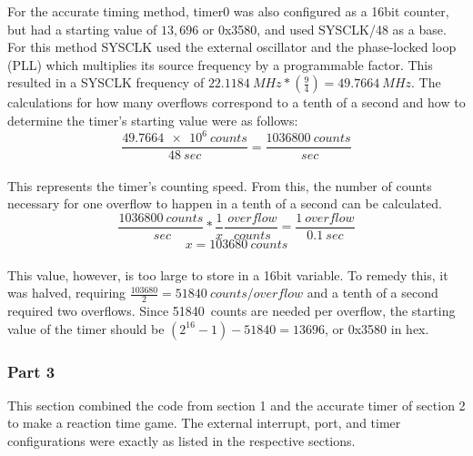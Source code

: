 \documentclass[12pt]{article}
\begin{document}
For the accurate timing method, timer0 was also configured as a 16bit counter, but had a starting value of $13,696$ or 0x3580, and used SYSCLK/48 as a base. For this method SYSCLK used the external oscillator and the phase-locked loop (PLL) which multiplies its source frequency by a programmable factor. This resulted in a SYSCLK frequency of \begin{math}
	\SI{22.1184}{MHz}*\left(\frac{9}{4}\right) = \SI{49.7664}{MHz}
\end{math}.  The calculations for how many overflows correspond to a tenth of a second and how to determine the timer's starting value were as follows:\\
\begin{equation}
	\frac{\SI{49.7664e6}{counts}}{\SI{48}{sec}} = \frac{\SI{1036800}{counts}}{\SI{}{sec}}
\end{equation}\\
This represents the timer's counting speed. From this, the number of counts necessary for one overflow to happen in a tenth of a second can be calculated.\\
\begin{equation}
	\frac{\SI{1036800}{counts}}{\SI{}{sec}}*\frac{1}{x}\frac{\SI{}{overflow}}{\SI{}{counts}} = \frac{\SI{1}{overflow}}{\SI{0.1}{sec}}
\end{equation}
\begin{equation}
 x = \SI{103680}{counts}
\end{equation}\\
This value, however, is too large to store in a 16bit variable. To remedy this, it was halved, requiring \begin{math}
	\frac{103680}{2} = \SI{51840}{counts\per overflow}
\end{math} and a tenth of a second required two overflows. Since \SI{51840}{counts} are needed per overflow, the starting value of the timer should be \begin{math}
(2^{16}-1)-51840 = 13696
\end{math}, or 0x3580 in hex.

\subsubsection{Part 3}
This section combined the code from section 1 and the accurate timer of section 2 to make a reaction time game. The external interrupt, port, and timer configurations were exactly as listed in the respective sections.
\end{document}
